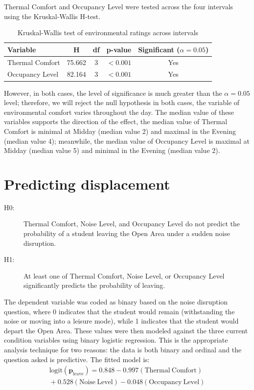 \documentclass[12pt, a4paper]{report}
\begin{document}
\newpage

Thermal Comfort and Occupancy Level were tested across the four intervals using the Kruskal-Wallis H-test.
\begin{table}[H]
    \centering
    \caption{Kruskal-Wallis test of environmental ratings across intervals}
    \label{tab:kruskal}
    \begin{tabular}{|l|c|c|c|c|}
        \hline
        \textbf{Variable} & \textbf{H} & \textbf{df} & \textbf{p-value} & \textbf{Significant ($\alpha=0.05$)} \\ \hline
        Thermal Comfort  & 75.662 & 3 & $<0.001$ & Yes \\ \hline
        Occupancy Level  & 82.164 & 3 & $<0.001$ & Yes \\ \hline
    \end{tabular}
\end{table}

However, in both cases, the level of significance is much greater than the $\alpha = 0.05$ level; therefore, we will reject the null hypothesis in both cases, the variable of environmental comfort varies throughout the day. The median value of these variables supports the direction of the effect, the median value of Thermal Comfort is minimal at Midday (median value 2) and maximal in the Evening (median value 4); meanwhile, the median value of Occupancy Level is maximal at Midday (median value 5) and minimal in the Evening (median value 2).

\section{Predicting displacement}

\begin{description}
    \item[H0:] Thermal Comfort, Noise Level, and Occupancy Level do not predict the probability of a student leaving the Open Area under a sudden noise disruption.
    \item[H1:] At least one of Thermal Comfort, Noise Level, or Occupancy Level significantly predicts the probability of leaving.
\end{description}

The dependent variable was coded as binary based on the noise disruption question, where 0 indicates that the student would remain (withstanding the noise or moving into a leisure mode), while 1 indicates that the student would depart the Open Area. These values were then modeled against the three current condition variables using binary logistic regression. This is the appropriate analysis technique for two reasons: the data is both binary and ordinal and the question asked is predictive. The fitted model is:
\begin{multline}
    \boldsymbol{\mathrm{logit}(p_{\mathrm{leave}}) = 0.848 - 0.997(\mathrm{Thermal\ Comfort})} \\
    \boldsymbol{{}+ 0.528(\mathrm{Noise\ Level}) - 0.048(\mathrm{Occupancy\ Level})}
    \label{eq:logit}
\end{multline}
\end{document}
